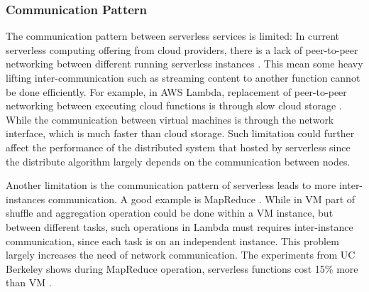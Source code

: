 \subsubsection{Communication Pattern}
The communication pattern between serverless services is limited: 
In current serverless computing offering from cloud providers, there is a lack of peer-to-peer networking between different running serverless instances \cite{hellerstein2018serverless}. This mean some heavy lifting inter-communication such as streaming content to another function \cite{ServerlessNetworking} cannot be done efficiently. For example, in AWS Lambda, replacement of peer-to-peer networking between executing cloud functions is through slow cloud storage \cite{hellerstein2018serverless}. While the communication between virtual machines is through the network interface, which is much faster than cloud storage. Such limitation could further affect the performance of the distributed system that hosted by serverless since the distribute algorithm largely depends on the communication between nodes.
\par
Another limitation is the communication pattern of serverless leads to more inter-instances communication. A good example is MapReduce \cite{jonas2019cloud}. While in VM part of shuffle and aggregation operation could be done within a VM instance, but between different tasks, such operations in Lambda must requires inter-instance communication, since each task is on an independent instance. This problem largely increases the need of network communication. The experiments from UC Berkeley shows during MapReduce operation, serverless functions cost 15\% more than VM \cite{jonas2019cloud}.
